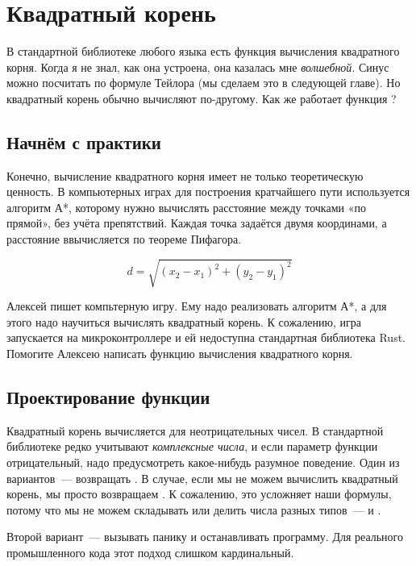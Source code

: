 \section{Квадратный корень}

В стандартной библиотеке любого языка есть функция вычисления квадратного корня.
Когда я не знал, как она устроена, она казалась мне {\em волшебной}.
Синус можно посчитать по формуле Тейлора (мы сделаем это в следующей главе).
Но квадратный корень обычно вычисляют по-другому.
Как же работает функция ?

\subsection{Начнём с практики}

Конечно, вычисление квадратного корня имеет не только теоретическую ценность.
В компьютерных играх для построения кратчайшего пути используется алгоритм А*, которому нужно вычислять расстояние между точками «по прямой», без учёта препятствий.
Каждая точка задаётся двумя координами, а расстояние ввычисляется по теореме Пифагора.

$$
d = \sqrt {(x_2 - x_1)^2 + (y_2 - y_1)^2}
$$

\begin{Exercise}
  \Question
  Алексей пишет компьтерную игру.
  Ему надо реализовать алгоритм А*, а для этого надо научиться вычислять квадратный корень.
  К сожалению, игра запускается на микроконтроллере и ей недоступна стандартная библиотека Rust.
  Помогите Алексею написать функцию вычисления квадратного корня.
\end{Exercise}

\subsection{Проектирование функции}

Квадратный корень вычисляется для неотрицательных чисел.
В стандартной библиотеке редко учитывают {\em комплексные числа}, и если параметр функции отрицательный, надо предусмотреть какое-нибудь разумное поведение.
Один из вариантов~--- возвращать .
В случае, если мы не можем вычислить квадратный корень, мы просто возвращаем .
К сожалению, это усложняет наши формулы, потому что мы не можем складывать или делить числа разных типов~---  и .

Второй вариант~--- вызывать панику и останавливать программу.
Для реального промышленного кода этот подход слишком кардинальный.

